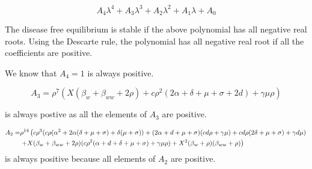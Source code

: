 \documentclass[11pt]{article}
\begin{document}
\begin{equation}
	A_4 \lambda^4 + A_3 \lambda^3 + A_2 \lambda^2 + A_1 \lambda + A_0
\end{equation}

The disease free equilibrium is stable if the above polynomial has all negative real roots. Using the Descarte rule, the polynomial has all negative real root if all the coefficients are positive.

We know that $A_4 = 1$ is always positive. 

\begin{equation}
	A_3 = \rho ^7 \left(X (\beta_w + \beta_{ww}+2 \rho ) + c \rho^2  (2 \alpha +\delta +\mu +\sigma + 2 d  )+\gamma  \mu  \rho \right)
\end{equation}

is always postive as all the elements of $A_3$ are positive.

\begin{align}
	A_2 = & \rho^{14} \left(c \rho ^3 (c \rho  (\alpha ^2+2 \alpha  (\delta +\mu +\sigma )+\delta  (\mu +\sigma ))+(2 \alpha +d+\mu +\sigma ) (c d \rho +\gamma  \mu )+c d \rho  (2 \delta +\mu +\sigma )+\gamma  d \mu ) \right. \notag \\
	&\left. +X (\beta_w + \beta_{ww}+2 \rho ) (c \rho ^2 (\alpha +d+\delta +\mu +\sigma )+\gamma  \mu  \rho )+X^2 (\beta_w+\rho ) (\beta_{ww}+\rho )\right)
\end{align}
is always positive because all elements of $A_2$ are positive.
\end{document}
